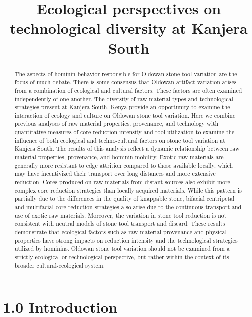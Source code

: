 \documentclass[]{elsarticle} %
\begin{document}
\begin{frontmatter}

  \title{Ecological perspectives on technological diversity at Kanjera South}
      
  \begin{abstract}
  The aspects of hominin behavior responsible for Oldowan stone tool
  variation are the focus of much debate. There is some consensus that
  Oldowan artifact variation arises from a combination of ecological and
  cultural factors. These factors are often examined independently of one
  another. The diversity of raw material types and technological
  strategies present at Kanjera South, Kenya provide an opportunity to
  examine the interaction of ecology and culture on Oldowan stone tool
  variation. Here we combine previous analyses of raw material properties,
  provenance, and technology with quantitative measures of core reduction
  intensity and tool utilization to examine the influence of both
  ecological and techno-cultural factors on stone tool variation at
  Kanjera South. The results of this analysis reflect a dynamic
  relationship between raw material properties, provenance, and hominin
  mobility. Exotic raw materials are generally more resistant to edge
  attrition compared to those available locally, which may have
  incentivized their transport over long distances and more extensive
  reduction. Cores produced on raw materials from distant sources also
  exhibit more complex core reduction strategies than locally acquired
  materials. While this pattern is partially due to the differences in the
  quality of knappable stone, bifacial centripetal and multifacial core
  reduction strategies also arise due to the continuous transport and use
  of exotic raw materials. Moreover, the variation in stone tool reduction
  is not consistent with neutral models of stone tool transport and
  discard. These results demonstrate that ecological factors such as raw
  material provenance and physical properties have strong impacts on
  reduction intensity and the technological strategies utilized by
  hominins. Oldowan stone tool variation should not be examined from a
  strictly ecological or technological perspective, but rather within the
  context of its broader cultural-ecological system.
  \end{abstract}
  
 \end{frontmatter}

\hypertarget{introduction}{%
\section{1.0 Introduction}\label{introduction}}
\end{document}
